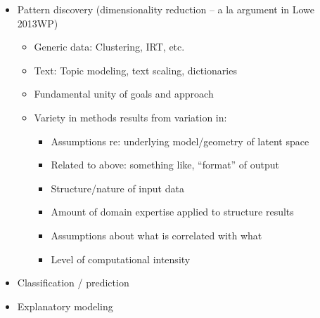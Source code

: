 \documentclass[12pt,]{article}
\providecommand{\tightlist}{%
  \setlength{\itemsep}{0pt}\setlength{\parskip}{0pt}}
\begin{document}
\begin{itemize}
\item
  Pattern discovery (dimensionality reduction -- a la argument in Lowe
  2013WP)

  \begin{itemize}
  \tightlist
  \item
    Generic data: Clustering, IRT, etc.
  \item
    Text: Topic modeling, text scaling, dictionaries
  \item
    Fundamental unity of goals and approach
  \item
    Variety in methods results from variation in:

    \begin{itemize}
    \tightlist
    \item
      Assumptions re: underlying model/geometry of latent space
    \item
      Related to above: something like, ``format'' of output
    \item
      Structure/nature of input data
    \item
      Amount of domain expertise applied to structure results
    \item
      Assumptions about what is correlated with what
    \item
      Level of computational intensity
    \end{itemize}
  \end{itemize}
\item
  Classification / prediction
\item
  Explanatory modeling
\end{itemize}


\end{document}

